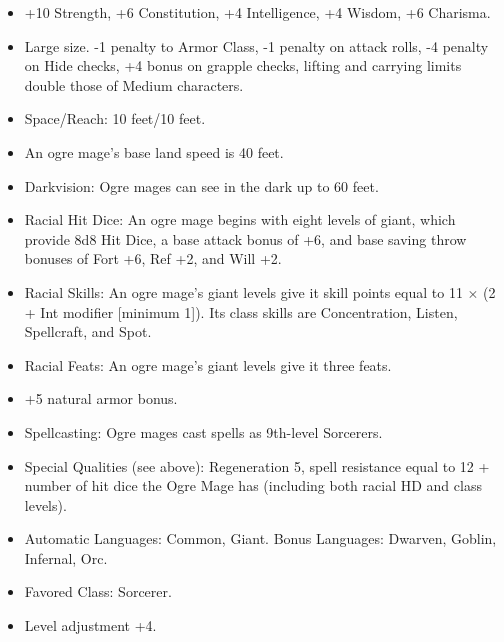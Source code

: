 \begin{itemize}
 \item +10 Strength, +6 Constitution, +4 Intelligence, +4 Wisdom, +6 Charisma.
 \item Large size. -1 penalty to Armor Class, -1 penalty on attack rolls, -4 penalty on Hide checks, +4 bonus on grapple checks, lifting and carrying limits double those of Medium characters.
 \item Space/Reach: 10 feet/10 feet.
 \item An ogre mage's base land speed is 40 feet.
 \item Darkvision: Ogre mages can see in the dark up to 60 feet.
 \item Racial Hit Dice: An ogre mage begins with eight levels of giant, which provide 8d8 Hit Dice, a base attack bonus of +6, and base saving throw bonuses of Fort +6, Ref +2, and Will +2.
 \item Racial Skills: An ogre mage's giant levels give it skill points equal to 11 $\times$ (2 + Int modifier [minimum 1]). Its class skills are Concentration, Listen, Spellcraft, and Spot.
 \item Racial Feats: An ogre mage's giant levels give it three feats.
 \item +5 natural armor bonus.
 \item Spellcasting: Ogre mages cast spells as 9th-level Sorcerers.
 \item Special Qualities (see above): Regeneration 5, spell resistance equal to 12 + number of hit dice the Ogre Mage has (including both racial HD and class levels).
 \item Automatic Languages: Common, Giant. Bonus Languages: Dwarven, Goblin, Infernal, Orc.
 \item Favored Class: Sorcerer.
 \item Level adjustment +4.
\end{itemize}